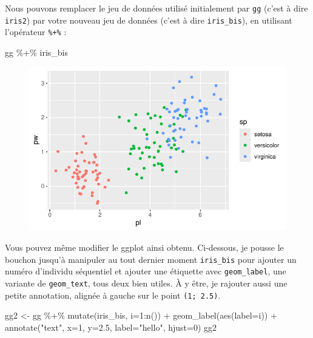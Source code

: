 \documentclass[
  letterpaper,
  DIV=11,
  numbers=noendperiod]{scrreprt}
\newenvironment{Shaded}{\begin{snugshade}}{\end{snugshade}}
\newcommand{\AttributeTok}[1]{\textcolor[rgb]{0.40,0.45,0.13}{#1}}
\newcommand{\DecValTok}[1]{\textcolor[rgb]{0.68,0.00,0.00}{#1}}
\newcommand{\FloatTok}[1]{\textcolor[rgb]{0.68,0.00,0.00}{#1}}
\newcommand{\FunctionTok}[1]{\textcolor[rgb]{0.28,0.35,0.67}{#1}}
\newcommand{\NormalTok}[1]{\textcolor[rgb]{0.00,0.23,0.31}{#1}}
\newcommand{\OtherTok}[1]{\textcolor[rgb]{0.00,0.23,0.31}{#1}}
\newcommand{\SpecialCharTok}[1]{\textcolor[rgb]{0.37,0.37,0.37}{#1}}
\newcommand{\StringTok}[1]{\textcolor[rgb]{0.13,0.47,0.30}{#1}}
\begin{document}
Nous pouvons remplacer le jeu de données utilisé initialement par
\texttt{gg} (c'est à dire \texttt{iris2}) par votre nouveau jeu de
données (c'est à dire \texttt{iris\_bis}), en utilisant l'opérateur
\texttt{\%+\%} :

\begin{Shaded}
\begin{Highlighting}[]
\NormalTok{gg }\SpecialCharTok{\%+\%}\NormalTok{ iris\_bis}
\end{Highlighting}
\end{Shaded}

\begin{figure}[H]

{\centering \includegraphics{ggplot2_files/figure-pdf/unnamed-chunk-33-1.pdf}

}

\end{figure}

Vous pouvez même modifier le ggplot ainsi obtenu. Ci-dessous, je pousse
le bouchon jusqu'à manipuler au tout dernier moment \texttt{iris\_bis}
pour ajouter un numéro d'individu séquentiel et ajouter une étiquette
avec \texttt{geom\_label}, une variante de \texttt{geom\_text}, tous
deux bien utiles. À y être, je rajouter aussi une petite annotation,
alignée à gauche sur le point \texttt{(1;\ 2.5)}.

\begin{Shaded}
\begin{Highlighting}[]
\NormalTok{gg2 }\OtherTok{\textless{}{-}}\NormalTok{ gg }\SpecialCharTok{\%+\%} \FunctionTok{mutate}\NormalTok{(iris\_bis, }\AttributeTok{i=}\DecValTok{1}\SpecialCharTok{:}\FunctionTok{n}\NormalTok{()) }\SpecialCharTok{+} 
  \FunctionTok{geom\_label}\NormalTok{(}\FunctionTok{aes}\NormalTok{(}\AttributeTok{label=}\NormalTok{i)) }\SpecialCharTok{+} 
  \FunctionTok{annotate}\NormalTok{(}\StringTok{"text"}\NormalTok{, }\AttributeTok{x=}\DecValTok{1}\NormalTok{, }\AttributeTok{y=}\FloatTok{2.5}\NormalTok{, }\AttributeTok{label=}\StringTok{"hello"}\NormalTok{, }\AttributeTok{hjust=}\DecValTok{0}\NormalTok{)}
\NormalTok{gg2}
\end{Highlighting}
\end{Shaded}
\end{document}
